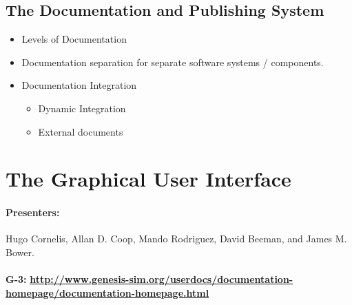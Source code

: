 \documentclass[12pt]{article}
\begin{document}
\subsection{The Documentation and Publishing System}

\begin{itemize}
\item Levels of Documentation
\item Documentation separation for separate software systems /
  components.
\item Documentation Integration
  \begin{itemize}
  \item Dynamic Integration
  \item External documents %
  \end{itemize}
\end{itemize}


\section{The Graphical User Interface}


\paragraph*{Presenters:}
Hugo Cornelis, Allan D. Coop, Mando Rodriguez, David Beeman, and James M. Bower. \\

 \\
{\bf G-3:} {\scriptsize \href{http://www.genesis-sim.org/userdocs/documentation-homepage/documentation-homepage.html}{\bf http://www.genesis-sim.org/userdocs/documentation-homepage/documentation-homepage.html}} \\
\end{document}
